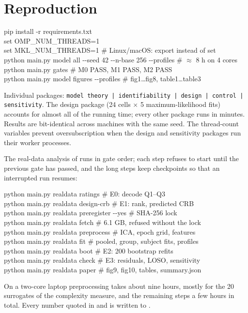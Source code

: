 \documentclass[12pt,a4paper]{article}
\theoremstyle{plain}
\theoremstyle{definition}
\theoremstyle{remark}
\newcommand{\code}[1]{\texttt{#1}}
\begin{document}
\section{Reproduction}
\label{app:repro}

\begin{tcolorbox}[algbox]
\small\ttfamily
pip install -r requirements.txt\\
set OMP\_NUM\_THREADS=1\\
set MKL\_NUM\_THREADS=1 \quad \# Linux/macOS: export instead of set\\
python main.py model all -{}-seed 42 -{}-n-base 256 -{}-profiles \quad \# $\approx$ 8 h on 4 cores\\
python main.py gates \quad \# M0 PASS, M1 PASS, M2 PASS\\
python main.py model figures -{}-profiles \quad \# fig1\ldots fig8, table1\ldots table3
\end{tcolorbox}
Individual packages: \code{model theory | identifiability | design | control | sensitivity}. The design package (24 cells $\times$ 5 maximum-likelihood fits) accounts for almost all of the running time; every other package runs in minutes. Results are bit-identical across machines with the same seed. The thread-count variables prevent oversubscription when the design and sensitivity packages run their worker processes.

The real-data analysis of  runs in gate order; each step refuses to start until the previous gate has passed, and the long steps keep checkpoints so that an interrupted run resumes:
\begin{tcolorbox}[algbox]
\small\ttfamily
python main.py realdata ratings \quad \# E0: decode Q1--Q3\\
python main.py realdata design-crb \quad \# E1: rank, predicted CRB\\
python main.py realdata preregister -{}-yes \quad \# SHA-256 lock\\
python main.py realdata fetch \quad \# 6.1 GB, refused without the lock\\
python main.py realdata preprocess \quad \# ICA, epoch grid, features\\
python main.py realdata fit \quad \# pooled, group, subject fits, profiles\\
python main.py realdata boot \quad \# E2: 200 bootstrap refits\\
python main.py realdata check \quad \# E3: residuals, LOSO, sensitivity\\
python main.py realdata paper \quad \# fig9, fig10, tables, summary.json
\end{tcolorbox}
On a two-core laptop preprocessing takes about nine hours, mostly for the 20 surrogates of the complexity measure, and the remaining steps a few hours in total. Every number quoted in  and  is written to .
\end{document}
